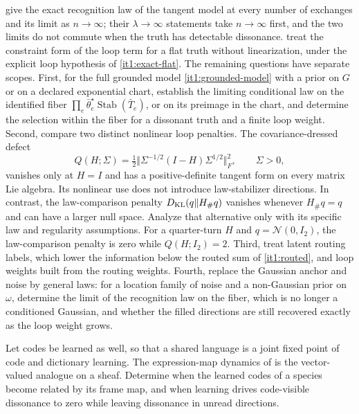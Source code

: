 \documentclass[11pt,letterpaper]{report}
\newcommand{\Stab}{\operatorname{Stab}}
\begin{document}
 give the exact recognition law of the tangent model at every number of exchanges and its limit as $n\to\infty$; their $\lambda\to\infty$ statements take $n\to\infty$ first, and the two limits do not commute when the truth has detectable dissonance.  treat the constraint form of the loop term for a flat truth without linearization, under the explicit loop hypothesis of \cref{it1:exact-flat}. The remaining questions have separate scopes. First, for the full grounded model \cref{it1:grounded-model} with a prior on $G$ or on a declared exponential chart, establish the limiting conditional law on the identified fiber $\prod_e\bar\theta^\star_e\Stab(\bar T_e)$, or on its preimage in the chart, and determine the selection within the fiber for a dissonant truth and a finite loop weight. Second, compare two distinct nonlinear loop penalties. The covariance-dressed defect
\begin{equation}
Q(H;\Sigma)=\tfrac12\Vert\Sigma^{-1/2}(I-H)\Sigma^{1/2}\Vert_F^2,\qquad \Sigma>0,
\label{it1:dressed-defect}
\end{equation}
vanishes only at $H=I$ and has a positive-definite tangent form on every matrix Lie algebra. Its nonlinear use does not introduce law-stabilizer directions. In contrast, the law-comparison penalty $D_{\mathrm{KL}}(q\Vert H_\#q)$ vanishes whenever $H_\#q=q$ and can have a larger null space. Analyze that alternative only with its specific law and regularity assumptions. For a quarter-turn $H$ and $q=\mathcal N(0,I_2)$, the law-comparison penalty is zero while $Q(H;I_2)=2$. Third, treat latent routing labels, which lower the information below the routed sum of \cref{it1:routed}, and loop weights built from the routing weights. Fourth, replace the Gaussian anchor and noise by general laws: for a location family of noise and a non-Gaussian prior on $\omega$, determine the limit of the recognition law on the fiber, which is no longer a conditioned Gaussian, and whether the filled directions are still recovered exactly as the loop weight grows.

Let codes be learned as well, so that a shared language is a joint fixed point of code and dictionary learning. The expression-map dynamics of \citet{HansenGhrist2021} is the vector-valued analogue on a sheaf. Determine when the learned codes of a species become related by its frame map, and when learning drives code-visible dissonance to zero while leaving dissonance in unread directions.
\end{document}
